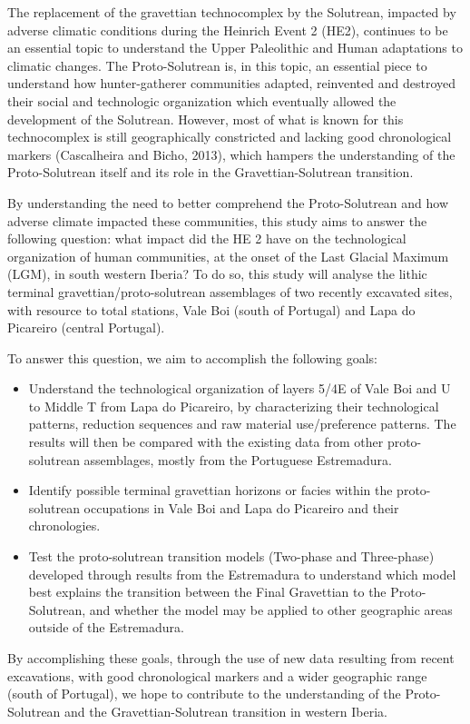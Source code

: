 \documentclass[12pt,twoside]{reedthesis}
\begin{document}
The replacement of the gravettian technocomplex by the Solutrean, impacted by adverse climatic conditions during the Heinrich Event 2 (HE2), continues to be an essential topic to understand the Upper Paleolithic and Human adaptations to climatic changes. The Proto-Solutrean is, in this topic, an essential piece to understand how hunter-gatherer communities adapted, reinvented and destroyed their social and technologic organization which eventually allowed the development of the Solutrean. However, most of what is known for this technocomplex is still geographically constricted and lacking good chronological markers (Cascalheira and Bicho, 2013), which hampers the understanding of the Proto-Solutrean itself and its role in the Gravettian-Solutrean transition.

By understanding the need to better comprehend the Proto-Solutrean and how adverse climate impacted these communities, this study aims to answer the following question: what impact did the HE 2 have on the technological organization of human communities, at the onset of the Last Glacial Maximum (LGM), in south western Iberia? To do so, this study will analyse the lithic terminal gravettian/proto-solutrean assemblages of two recently excavated sites, with resource to total stations, Vale Boi (south of Portugal) and Lapa do Picareiro (central Portugal).

To answer this question, we aim to accomplish the following goals:
\begin{itemize}
\item
  Understand the technological organization of layers 5/4E of Vale Boi and U to Middle T from Lapa do Picareiro, by characterizing their technological patterns, reduction sequences and raw material use/preference patterns. The results will then be compared with the existing data from other proto-solutrean assemblages, mostly from the Portuguese Estremadura.
\item
  Identify possible terminal gravettian horizons or facies within the proto-solutrean occupations in Vale Boi and Lapa do Picareiro and their chronologies.
\item
  Test the proto-solutrean transition models (Two-phase and Three-phase) developed through results from the Estremadura to understand which model best explains the transition between the Final Gravettian to the Proto-Solutrean, and whether the model may be applied to other geographic areas outside of the Estremadura.
\end{itemize}
By accomplishing these goals, through the use of new data resulting from recent excavations, with good chronological markers and a wider geographic range (south of Portugal), we hope to contribute to the understanding of the Proto-Solutrean and the Gravettian-Solutrean transition in western Iberia.
\end{document}
